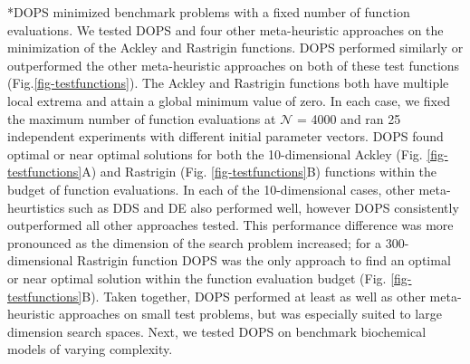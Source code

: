 \documentclass[12pt]{article}
\makeatletter
\renewcommand\subsection{\@startsection
	{subsection}{2}{0mm}
	{-0.05in}
	{-0.5\baselineskip}
	{\normalfont\normalsize\bfseries}}
\makeatother
\begin{document}
\subsection*{DOPS minimized benchmark problems with a fixed number of function evaluations.}
We tested DOPS and four other meta-heuristic approaches on the minimization of the Ackley and Rastrigin functions.
DOPS performed similarly or outperformed the other meta-heuristic approaches on both of these test functions (Fig.\ref{fig-testfunctions}).
The Ackley and Rastrigin functions both have multiple local extrema and attain a global minimum value of zero.
In each case, we fixed the maximum number of function evaluations at $\mathcal{N}$ = 4000 and ran 25 independent experiments with different initial parameter vectors.
DOPS found optimal or near optimal solutions for both the 10-dimensional Ackley (Fig. \ref{fig-testfunctions}A) and Rastrigin (Fig. \ref{fig-testfunctions}B) functions within the budget of function evaluations.
In each of the 10-dimensional cases, other meta-heurtistics such as DDS and DE also performed well, however DOPS consistently outperformed all other approaches tested.
This performance difference was more pronounced as the dimension of the search problem increased; for a 300-dimensional Rastrigin function DOPS was the only approach to find an optimal or near optimal solution
within the function evaluation budget (Fig. \ref{fig-testfunctions}B).
Taken together, DOPS performed at least as well as other meta-heuristic approaches on small test problems, but was especially suited to large dimension search spaces.
Next, we tested DOPS on benchmark biochemical models of varying complexity.
\end{document}
